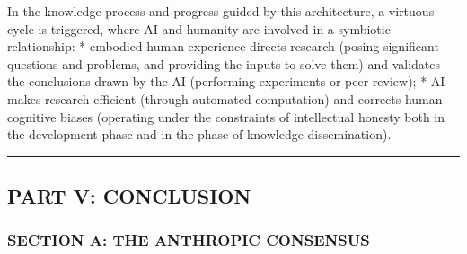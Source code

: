 \documentclass[11pt,a4paper,oneside]{article} %
\begin{document}
\hypertarget{the-positive-feedback-loop}{%
\label{the-positive-feedback-loop}}

In the knowledge process and progress guided by this architecture, a
virtuous cycle is triggered, where AI and humanity are involved in a
symbiotic relationship: * embodied human experience directs research
(posing significant questions and problems, and providing the inputs to
solve them) and validates the conclusions drawn by the AI (performing
experiments or peer review); * AI makes research efficient (through
automated computation) and corrects human cognitive biases (operating
under the constraints of intellectual honesty both in the development
phase and in the phase of knowledge dissemination).

\begin{center}\rule{0.5\linewidth}{0.5pt}\end{center}

\hypertarget{part-v-conclusion}{%
\subsection{PART V: CONCLUSION}\label{part-v-conclusion}}

\hypertarget{section-a-the-anthropic-consensus}{%
\subsubsection{SECTION A: THE ANTHROPIC
CONSENSUS}\label{section-a-the-anthropic-consensus}}

\hypertarget{positive-outcomes}{%
\label{positive-outcomes}}
\end{document}
